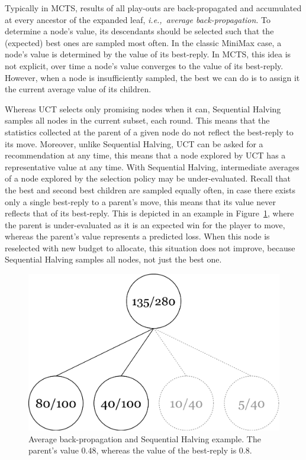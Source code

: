 \documentclass{kecsmstr}
\newcommand{\ie}{{\it i.e.,}~}
\begin{document}
Typically in MCTS, results of all play-outs are back-propagated and accumulated at every ancestor of the expanded leaf, \ie \emph{average back-propagation}. To determine a node's value, its descendants should be selected such that the (expected) best ones are sampled most often. In the classic MiniMax case, a node's value is determined by the value of its best-reply. In MCTS, this idea is not explicit, over time a node's value converges to the value of its best-reply. However, when a node is insufficiently sampled, the best we can do is to assign it the current average value of its children.

Whereas UCT selects only promising nodes when it can, Sequential Halving samples all nodes in the current subset, each round. This means that the statistics collected at the parent of a given node do not reflect the best-reply to its move. Moreover, unlike Sequential Halving, UCT can be asked for a recommendation at any time, this means that a node explored by UCT has a representative value at any time. With Sequential Halving, intermediate averages of a node explored by the selection policy may be under-evaluated. Recall that the best and second best children are sampled equally often, in case there exists only a single best-reply to a parent's move, this means that its value never reflects that of its best-reply. This is depicted in an example in Figure~\ref{fig:seq_halv_bp}, where the parent is under-evaluated as it is an expected win for the player to move, whereas the parent's value represents a predicted loss. When this node is reselected with new budget to allocate, this situation does not improve, because Sequential Halving samples all nodes, not just the best one.

\begin{figure}[h]
	\centering
	\includegraphics[width=.55\textwidth]{img/seq_halv_bp.png}
	\caption{Average back-propagation and Sequential Halving example. The parent's value $0.48$, whereas the value of the best-reply is $0.8$.}
	\label{fig:seq_halv_bp}
\end{figure}
\end{document}
